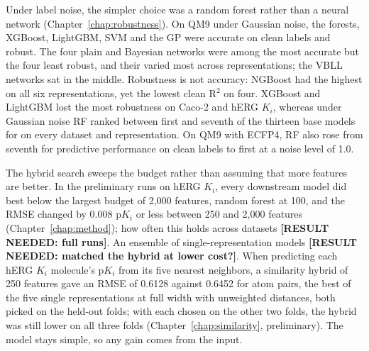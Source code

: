 Under label noise, the simpler choice was a random forest rather than a neural network (Chapter~\ref{chap:robustness}). On QM9 under Gaussian noise, the forests, XGBoost, LightGBM, SVM and the GP were accurate on clean labels and robust. The four plain and Bayesian networks were among the most accurate but the four least robust, and their \aucnorm{} varied most across representations; the VBLL networks sat in the middle. Robustness is not accuracy: NGBoost had the highest \aucnorm{} on all six representations, yet the lowest clean R$^2$ on four. XGBoost and LightGBM lost the most robustness on Caco-2 and hERG $K_i$, whereas under Gaussian noise RF ranked between first and seventh of the thirteen base models for \aucnorm{} on every dataset and representation. On QM9 with ECFP4, RF also rose from seventh for predictive performance on clean labels to first at a noise level of 1.0.

The hybrid search sweeps the budget rather than assuming that more features are better. In the preliminary runs on hERG $K_i$, every downstream model did best below the largest budget of 2,000 features, random forest at 100, and the RMSE changed by 0.008 p$K_i$ or less between 250 and 2,000 features (Chapter~\ref{chap:method}); how often this holds across datasets \textbf{[RESULT NEEDED: full runs]}. An ensemble of single-representation models \textbf{[RESULT NEEDED: matched the hybrid at lower cost?]}. When predicting each hERG $K_i$ molecule's p$K_i$ from its five nearest neighbors, a similarity hybrid of 250 features gave an RMSE of 0.6128 against 0.6452 for atom pairs, the best of the five single representations at full width with unweighted distances, both picked on the held-out folds; with each chosen on the other two folds, the hybrid was still lower on all three folds (Chapter~\ref{chap:similarity}, preliminary). The model stays simple, so any gain comes from the input.

